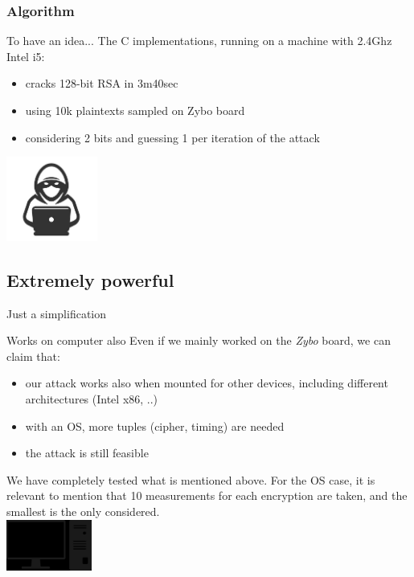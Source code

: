 \documentclass[aspectratio=169]{beamer}
\begin{document}
\begin{frame}[fragile]
    \frametitle{Algorithm}
    \begin{block}{To have an idea...}
        The C implementations, running on a machine with 2.4Ghz Intel i5:
        \begin{itemize}
            \pause \item cracks 128-bit RSA in 3m40sec
            \pause \item using 10k plaintexts sampled on Zybo board
            \pause \item considering 2 bits and guessing 1 per iteration of the attack
        \end{itemize}
    \end{block}
    \hfill \includegraphics[width=3cm]{./graphics/hacker}
\end{frame}

\subsection{Extremely powerful}
\begin{frame}{Just a simplification}
	\begin{block}{Works on computer also}
		Even if we mainly worked on the \textit{Zybo} board, we can claim that:
		\begin{itemize}
			\pause \item our attack works also when mounted for other devices, including different architectures (Intel x86, ..)
			\pause \item with an OS, more tuples (cipher, timing) are needed
			\pause \item the attack is still feasible
		\end{itemize}
    We have completely tested what is mentioned above. For the OS case, it is relevant to mention that 10 measurements for each encryption are taken, and the smallest is the only considered.\\
    \hfill
    \includegraphics[width=2.8cm]{./graphics/pc}
	\end{block}
\end{frame}
\end{document}
